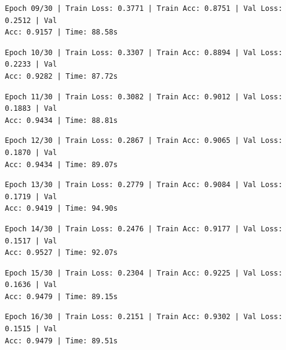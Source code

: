 \documentclass[11pt]{article}
\begin{document}
    \begin{Verbatim}[commandchars=\\\{\}]
Epoch 09/30 | Train Loss: 0.3771 | Train Acc: 0.8751 | Val Loss: 0.2512 | Val
Acc: 0.9157 | Time: 88.58s
    \end{Verbatim}

    \begin{Verbatim}[commandchars=\\\{\}]
Epoch 10/30 | Train Loss: 0.3307 | Train Acc: 0.8894 | Val Loss: 0.2233 | Val
Acc: 0.9282 | Time: 87.72s
    \end{Verbatim}

    \begin{Verbatim}[commandchars=\\\{\}]
Epoch 11/30 | Train Loss: 0.3082 | Train Acc: 0.9012 | Val Loss: 0.1883 | Val
Acc: 0.9434 | Time: 88.81s
    \end{Verbatim}

    \begin{Verbatim}[commandchars=\\\{\}]
Epoch 12/30 | Train Loss: 0.2867 | Train Acc: 0.9065 | Val Loss: 0.1870 | Val
Acc: 0.9434 | Time: 89.07s
    \end{Verbatim}

    \begin{Verbatim}[commandchars=\\\{\}]
Epoch 13/30 | Train Loss: 0.2779 | Train Acc: 0.9084 | Val Loss: 0.1719 | Val
Acc: 0.9419 | Time: 94.90s
    \end{Verbatim}

    \begin{Verbatim}[commandchars=\\\{\}]
Epoch 14/30 | Train Loss: 0.2476 | Train Acc: 0.9177 | Val Loss: 0.1517 | Val
Acc: 0.9527 | Time: 92.07s
    \end{Verbatim}

    \begin{Verbatim}[commandchars=\\\{\}]
Epoch 15/30 | Train Loss: 0.2304 | Train Acc: 0.9225 | Val Loss: 0.1636 | Val
Acc: 0.9479 | Time: 89.15s
    \end{Verbatim}

    \begin{Verbatim}[commandchars=\\\{\}]
Epoch 16/30 | Train Loss: 0.2151 | Train Acc: 0.9302 | Val Loss: 0.1515 | Val
Acc: 0.9479 | Time: 89.51s
    \end{Verbatim}
\end{document}
